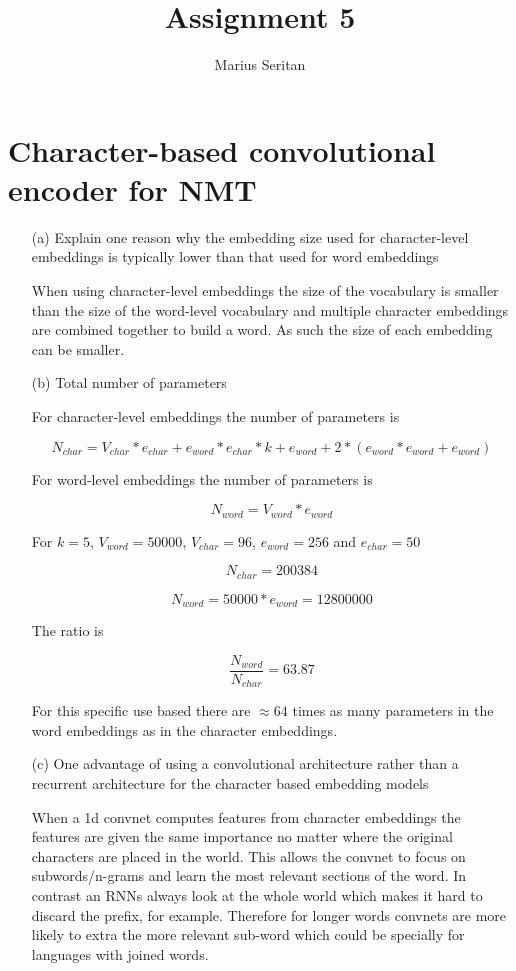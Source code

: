 \documentclass{article}
\begin{document}
\title{Assignment 5}
\author{Marius Seritan}
\maketitle

\section{Character-based convolutional encoder for NMT}

\begin{enumerate}

\item[(a)]{Explain one reason why the embedding size used for character-level embeddings is typically lower than that used for word embeddings}

When using character-level embeddings the size of the vocabulary is smaller than the size of the word-level vocabulary and multiple character embeddings are combined together to build a word. As such the size of each embedding can be smaller.

\item[(b)]{Total number of parameters}

For character-level embeddings the number of parameters is 

$$ N_{char} = V_{char} * e_{char} + e_{word} * e_{char} * k + e_{word} + 2 * (e_{word}*e_{word} + e_{word}) $$

For word-level embeddings the number of parameters is

$$ N_{word} = V_{word} * e_{word} $$

For $k = 5$, $V_{word} = 50000$, $V_{char} = 96$, $e_{word}=256$ and $e_{char}=50$

$$ N_{char} =  200384 $$

$$ N_{word} = 50000 * e_{word} = 12800000$$

The ratio is 

$$\frac{N_{word}}{N_{char}} = 63.87$$

For this specific use based there are $\approx 64$ times as many parameters in the word embeddings as in the character embeddings.


\item[(c)]{One advantage of using a convolutional architecture rather than a recurrent architecture for the character based embedding models}

When a 1d convnet computes features from character embeddings the features are given the same importance no matter where the original characters are placed in the world. This allows the convnet to focus on subwords/n-grams and learn the most relevant sections of the word. In contrast an RNNs always look at the whole world which makes it hard to discard the prefix, for example. Therefore for longer words convnets are more likely to extra the more relevant sub-word which could be specially for languages with joined words.


\end{enumerate}
\end{document}
